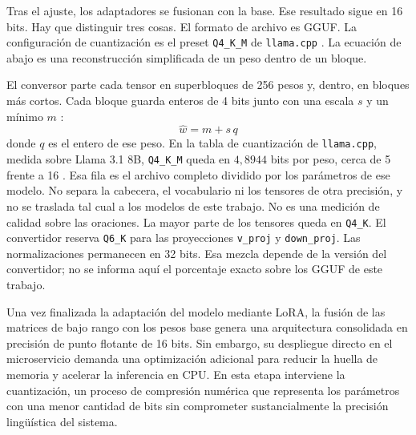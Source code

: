 

Tras el ajuste, los adaptadores se fusionan con la base. Ese resultado sigue en 16 bits. Hay que distinguir tres cosas. El formato de archivo es GGUF. La configuración de cuantización es el preset \texttt{Q4\_K\_M} de \texttt{llama.cpp} \parencite{gerganov2023llamacpp}. La ecuación de abajo es una reconstrucción simplificada de un peso dentro de un bloque.

El conversor parte cada tensor en superbloques de 256 pesos y, dentro, en bloques más cortos. Cada bloque guarda enteros de 4 bits junto con una escala $s$ y un mínimo $m$ \parencite{ggml2023kquants}:
\begin{equation}
\hat{w} = m + s\, q
\label{eq:reconstruccion_q4k}
\end{equation}
donde $q$ es el entero de ese peso. En la tabla de cuantización de \texttt{llama.cpp}, medida sobre Llama 3.1 8B, \texttt{Q4\_K\_M} queda en $4{,}8944$ bits por peso, cerca de 5 frente a 16 \parencite{gerganov2023llamacpp}. Esa fila es el archivo completo dividido por los parámetros de ese modelo. No separa la cabecera, el vocabulario ni los tensores de otra precisión, y no se traslada tal cual a los modelos de este trabajo. No es una medición de calidad sobre las oraciones. La mayor parte de los tensores queda en \texttt{Q4\_K}.  El convertidor reserva \texttt{Q6\_K} para las proyecciones \texttt{v\_proj} y \texttt{down\_proj}. Las normalizaciones permanecen en 32 bits. Esa mezcla depende de la versión del convertidor; no se informa aquí el porcentaje exacto sobre los GGUF de este trabajo. %

Una vez finalizada la adaptación del modelo mediante LoRA, la fusión de las matrices de bajo rango con los pesos base genera una arquitectura consolidada en precisión de punto flotante de 16 bits. Sin embargo, su despliegue directo en el microservicio demanda una optimización adicional para reducir la huella de memoria y acelerar la inferencia en CPU. En esta etapa interviene la cuantización, un proceso de compresión numérica que representa los parámetros con una menor cantidad de bits sin comprometer sustancialmente la precisión lingüística del sistema.

